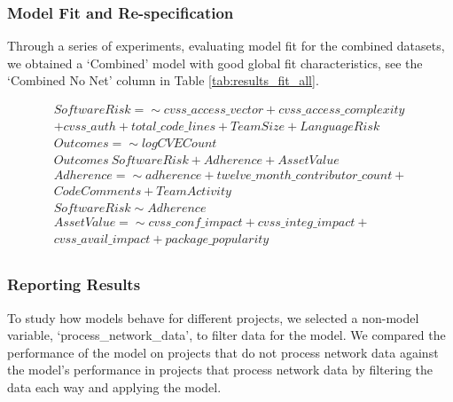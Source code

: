 \subsubsection{Model Fit and Re-specification}
Through a series of experiments, evaluating model fit for the combined datasets, we obtained a `Combined' model with good global fit characteristics, see the `Combined No Net' column in Table \ref{tab:results_fit_all}.

\begin{align*}
	SoftwareRisk =\sim cvss\_access\_vector + cvss\_access\_complexity\\
	 + cvss\_auth + total\_code\_lines + TeamSize + LanguageRisk\\
	Outcomes =\sim  logCVECount \\
	Outcomes ~ SoftwareRisk + Adherence + AssetValue\\
	Adherence =\sim adherence + twelve\_month\_contributor\_count +\\ CodeComments + TeamActivity \\
	SoftwareRisk \sim  Adherence\\
	AssetValue =\sim cvss\_conf\_impact + cvss\_integ\_impact +\\ cvss\_avail\_impact + package\_popularity\\
\end{align*}

\subsubsection{Reporting Results}
To study how models behave for different projects, we selected a non-model variable, `process\_network\_data', to filter data for the model. We compared the performance of the model on projects that do not process network data against the model's performance in projects that process network data by filtering the data each way and applying the model.

